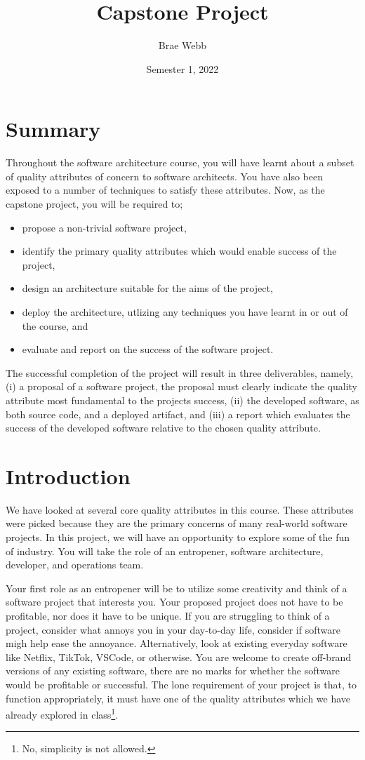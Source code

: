\documentclass[12pt]{article}
\title{Capstone Project}
\author{Brae Webb}
\date{Semester 1, 2022}
\begin{document}
\maketitle

\section*{Summary}
Throughout the software architecture course,
you will have learnt about a subset of quality attributes of concern to software architects.
You have also been exposed to a number of techniques to satisfy these attributes.
Now, as the capstone project, you will be required to;
\begin{itemize}
    \item propose a non-trivial software project,
    \item identify the primary quality attributes which would enable success of the project,
    \item design an architecture suitable for the aims of the project,
    \item deploy the architecture, utlizing any techniques you have learnt in or out of the course, and
    \item evaluate and report on the success of the software project.
\end{itemize}

The successful completion of the project will result in three deliverables, namely,
(i) a proposal of a software project, the proposal must clearly indicate the quality attribute most {\color{red} fundamental} to the projects success,
(ii) the developed software, as both source code, and a deployed artifact, and
(iii) a report which evaluates the success of the developed software relative to the chosen quality attribute.

\section{Introduction}
We have looked at several core quality attributes in this course.
These attributes were picked because they are the primary concerns of many real-world software projects.
In this project, we will have an opportunity to explore some of the fun of industry.
You will take the role of an entropener, software architecture, developer, and operations team.

Your first role as an entropener will be to utilize some creativity and think of a software project that interests you.
Your proposed project does not have to be profitable, nor does it have to be unique.
If you are struggling to think of a project, consider what annoys you in your day-to-day life, consider if software migh help ease the annoyance.
Alternatively, look at existing everyday software like Netflix, TikTok, VSCode, or otherwise.
You are welcome to create off-brand versions of any existing software,
there are no marks for whether the software would be profitable or successful.
The lone requirement of your project is that, to function appropriately, it must have one of the quality attributes which we have already explored in class\footnote{No, simplicity is not allowed.}.
\end{document}
